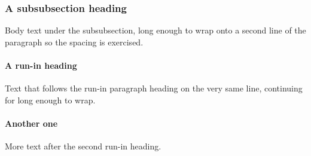 \documentclass[a4paper,10pt]{article}
\begin{document}
\subsubsection{A subsubsection heading}

Body text under the subsubsection, long enough to wrap onto a second line of
the paragraph so the spacing is exercised.

\paragraph{A run-in heading} Text that follows the run-in paragraph heading on
the very same line, continuing for long enough to wrap.

\paragraph{Another one} More text after the second run-in heading.
\end{document}

